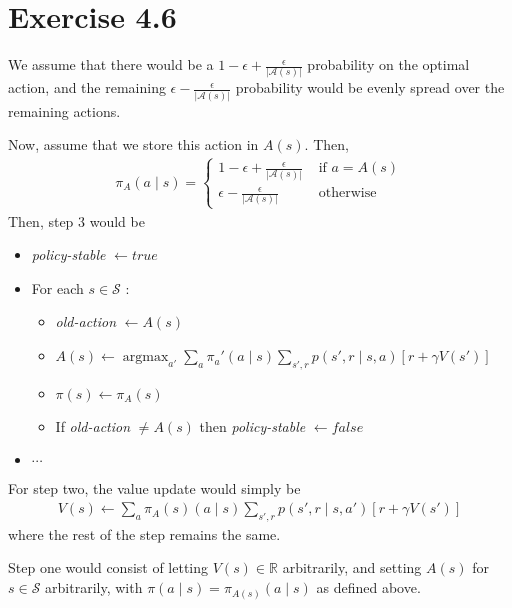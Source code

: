 \documentclass[a4paper,11pt,reqno]{amsart}
\newcounter{prob_counter}
\begin{document}
\section*{Exercise 4.6}
We assume that there would be a $1 - \epsilon + \frac{\epsilon}{|\mathcal{A}(s)|}$ probability on the optimal action, and the remaining $\epsilon - \frac{\epsilon}{|\mathcal{A}(s)|}$ probability would be evenly spread over the remaining actions. 

Now, assume that we store this action in $A(s)$. Then,
 \begin{align}
\pi_A (a \mid s) = 
\begin{cases}
    1 - \epsilon+\frac{\epsilon}{|\mathcal{A}(s)|} & \text{ if } a = A(s)\\
    \epsilon - \frac{\epsilon}{|\mathcal{A}(s)|} & \text{ otherwise } 
\end{cases}
\end{align}
Then, step 3 would be
\begin{itemize}
    \item \emph{policy-stable} $\leftarrow true$
    \item For each $s \in \mathcal{S}$ :
    \begin{itemize}
        \item \emph{old-action} $\leftarrow A(s)$
        \item $A(s) \leftarrow  \operatorname{argmax}_{a'}\sum_{a}\pi _a'(a \mid s) \sum_{s', r} p(s', r \mid s, a)\left[ r + \gamma V(s') \right]  $
        \item $\pi(s) \leftarrow \pi_A(s)$
        \item If \emph{old-action} $\neq A(s)$ then \emph{policy-stable} $\leftarrow false$
    \end{itemize}
    \item $\cdots $
\end{itemize}

For step two, the value update would simply be
\begin{align}
V(s) \leftarrow \sum_{a}\pi_A(s)(a \mid s) \sum_{s', r} p(s', r \mid s, a') \left[ r + \gamma V(s') \right]  
\end{align}
where the rest of the step remains the same.

Step one would consist of letting $V(s) \in  \mathbb{R}$ arbitrarily, and setting $A(s)$ for $s \in  \mathcal{S}$ arbitrarily, with $\pi (a \mid s) = \pi _{A(s)}(a \mid s)$ as defined above.
\end{document}
